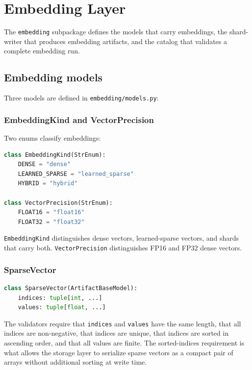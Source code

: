 \documentclass[11pt,a4paper]{article}
\begin{document}
\section{Embedding Layer}\label{sec:embedding}

The \texttt{embedding} subpackage defines the models that carry
embeddings, the shard-writer that produces embedding artifacts, and
the catalog that validates a complete embedding run.

\subsection{Embedding models}
Three models are defined in \texttt{embedding/models.py}:

\subsubsection{EmbeddingKind and VectorPrecision}
Two enums classify embeddings:

\begin{lstlisting}[language=python]
class EmbeddingKind(StrEnum):
    DENSE = "dense"
    LEARNED_SPARSE = "learned_sparse"
    HYBRID = "hybrid"

class VectorPrecision(StrEnum):
    FLOAT16 = "float16"
    FLOAT32 = "float32"
\end{lstlisting}

\texttt{EmbeddingKind} distinguishes dense vectors, learned-sparse
vectors, and shards that carry both. \texttt{VectorPrecision}
distinguishes FP16 and FP32 dense vectors.

\subsubsection{SparseVector}
\begin{lstlisting}[language=python]
class SparseVector(ArtifactBaseModel):
    indices: tuple[int, ...]
    values: tuple[float, ...]
\end{lstlisting}

The validators require that \texttt{indices} and \texttt{values} have
the same length, that all indices are non-negative, that indices are
unique, that indices are sorted in ascending order, and that all
values are finite. The sorted-indices requirement is what allows the
storage layer to serialize sparse vectors as a compact pair of arrays
without additional sorting at write time.
\end{document}

